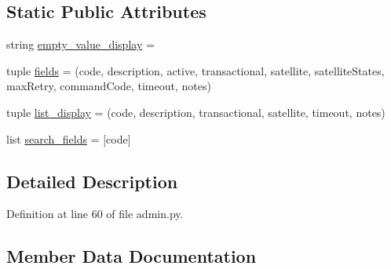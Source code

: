 \subsection*{Static Public Attributes}
\begin{DoxyCompactItemize}
\item 
string \hyperlink{class_ground_segment_1_1admin_1_1_command_type_admin_a33d28f3ea0909e227e12b323b479cd4b}{empty\+\_\+value\+\_\+display} = \textquotesingle{}\textquotesingle{}
\item 
tuple \hyperlink{class_ground_segment_1_1admin_1_1_command_type_admin_a1ee0f5d0adfcd6a4daab57e600d1e6e0}{fields} = (\textquotesingle{}code\textquotesingle{}, \textquotesingle{}description\textquotesingle{}, \textquotesingle{}active\textquotesingle{}, \textquotesingle{}transactional\textquotesingle{}, \textquotesingle{}satellite\textquotesingle{}, \textquotesingle{}satellite\+States\textquotesingle{}, \textquotesingle{}max\+Retry\textquotesingle{}, \textquotesingle{}command\+Code\textquotesingle{}, \textquotesingle{}timeout\textquotesingle{}, \textquotesingle{}notes\textquotesingle{})
\item 
tuple \hyperlink{class_ground_segment_1_1admin_1_1_command_type_admin_a5afd80db575f5f9696c042e09a22966d}{list\+\_\+display} = (\textquotesingle{}code\textquotesingle{}, \textquotesingle{}description\textquotesingle{}, \textquotesingle{}transactional\textquotesingle{}, \textquotesingle{}satellite\textquotesingle{}, \textquotesingle{}timeout\textquotesingle{}, \textquotesingle{}notes\textquotesingle{})
\item 
list \hyperlink{class_ground_segment_1_1admin_1_1_command_type_admin_a3a3f190f65a4c32395397c193a0b86e5}{search\+\_\+fields} = \mbox{[}\textquotesingle{}code\textquotesingle{}\mbox{]}
\end{DoxyCompactItemize}


\subsection{Detailed Description}


Definition at line 60 of file admin.\+py.



\subsection{Member Data Documentation}
\hypertarget{class_ground_segment_1_1admin_1_1_command_type_admin_a33d28f3ea0909e227e12b323b479cd4b}{}
